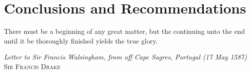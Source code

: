 \chapter{Conclusions and Recommendations}
\vspace*{\fill}
\epigraph{There must be a beginning of any great matter, but the continuing unto the end until it be thoroughly finished yields the true glory.}%
{\textit{Letter to Sir Francis Walsingham, from off Cape Sagres, Portugal (17 May 1587)} \textsc{Sir Francis Drake}}
\clearpage{\thispagestyle{empty}\cleardoublepage}
